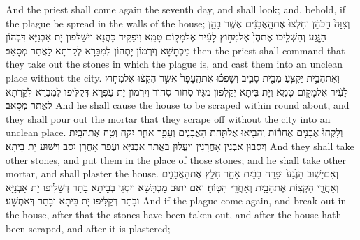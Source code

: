 {And the priest shall come again the seventh day, and shall look; and, behold, if the plague be spread in the walls of the house;}{}
{וְצִוָּה֙ הַכֹּהֵ֔ן וְחִלְּצוּ֙ אֶת\maqqaf הָ֣אֲבָנִ֔ים אֲשֶׁ֥ר בָּהֵ֖ן הַנָּ֑גַע וְהִשְׁלִ֤יכוּ אֶתְהֶן֙ אֶל\maqqaf מִח֣וּץ לָעִ֔יר אֶל\maqqaf מָק֖וֹם טָמֵֽא׃}
{וִיפַקֵּיד כָּהֲנָא וִישַׁלְּפוּן יָת אַבְנַיָּא דִּבְהוֹן מַכְתָּשָׁא וְיִרְמוֹן יָתְהוֹן לְמִבַּרָא לְקַרְתָּא לַאֲתַר מְסָאַב׃}
{then the priest shall command that they take out the stones in which the plague is, and cast them into an unclean place without the city.}{}
{וְאֶת\maqqaf הַבַּ֛יִת יַקְצִ֥עַ מִבַּ֖יִת סָבִ֑יב וְשָׁפְכ֗וּ אֶת\maqqaf הֶֽעָפָר֙ אֲשֶׁ֣ר הִקְצ֔וּ אֶל\maqqaf מִח֣וּץ לָעִ֔יר אֶל\maqqaf מָק֖וֹם טָמֵֽא׃}
{וְיָת בֵּיתָא יְקַלְּפוּן מִגָּיו סְחוֹר סְחוֹר וְיִרְמוֹן יָת עַפְרָא דְּקַלִּיפוּ לְמִבַּרָא לְקַרְתָּא לַאֲתַר מְסָאַב׃}
{And he shall cause the house to be scraped within round about, and they shall pour out the mortar that they scrape off without the city into an unclean place.}{}
{וְלָקְחוּ֙ אֲבָנִ֣ים אֲחֵר֔וֹת וְהֵבִ֖יאוּ אֶל\maqqaf תַּ֣חַת הָאֲבָנִ֑ים וְעָפָ֥ר אַחֵ֛ר יִקַּ֖ח וְטָ֥ח אֶת\maqqaf הַבָּֽיִת׃}
{וְיִסְּבוּן אַבְנִין אָחֳרָנִין וְיַעֲלוּן בַּאֲתַר אַבְנַיָּא וַעֲפַר אָחֳרָן יִסַּב וִישׁוּעַ יָת בֵּיתָא׃}
{And they shall take other stones, and put them in the place of those stones; and he shall take other mortar, and shall plaster the house.}{}
{וְאִם\maqqaf יָשׁ֤וּב הַנֶּ֙גַע֙ וּפָרַ֣ח בַּבַּ֔יִת אַחַ֖ר חִלֵּ֣ץ אֶת\maqqaf הָאֲבָנִ֑ים וְאַחֲרֵ֛י הִקְצ֥וֹת אֶת\maqqaf הַבַּ֖יִת וְאַחֲרֵ֥י הִטּֽוֹחַ׃}
{וְאִם יְתוּב מַכְתָּשָׁא וְיִסְגֵּי בְּבֵיתָא בָּתַר דְּשַׁלִּיפוּ יָת אַבְנַיָּא וּבָתַר דְּקַלִּיפוּ יָת בֵּיתָא וּבָתַר דְּאִתְּשָׁע׃}
{And if the plague come again, and break out in the house, after that the stones have been taken out, and after the house hath been scraped, and after it is plastered;}{}
